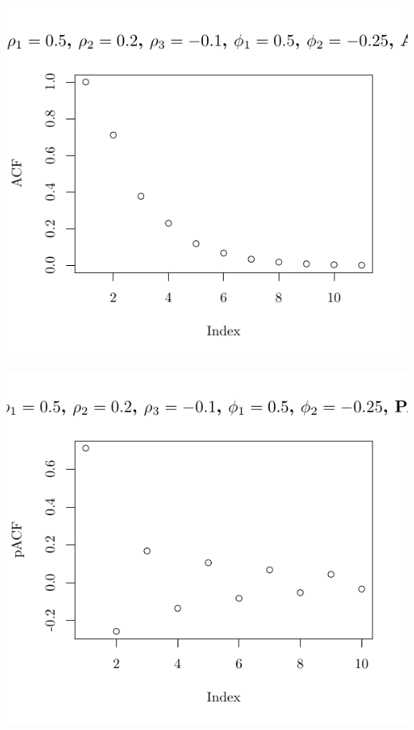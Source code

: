 \documentclass[10pt]{paper}\usepackage[]{graphicx}\usepackage[]{color}
\makeatletter
\def\maxwidth{ %
  \ifdim\Gin@nat@width>\linewidth
    \linewidth
  \else
    \Gin@nat@width
  \fi
}
\newenvironment{knitrout}{}{} %
\makeatother
\begin{document}
\begin{knitrout}
{\centering \includegraphics[width=\maxwidth]{figure/graphics-plotter-197} 

}




{\centering \includegraphics[width=\maxwidth]{figure/graphics-plotter-198} 

}





\end{knitrout}
\end{document}
